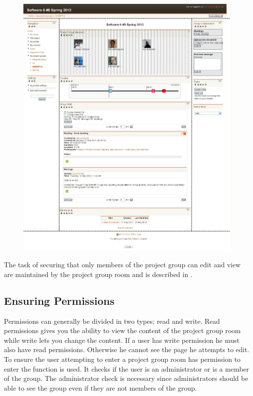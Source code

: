 \begin{figure}[h]
	\centering
		\includegraphics[width=\textwidth]{images/projectgroupwithedit.png}
	\label{fig:projectgroupwithedit}
\end{figure}


The task of securing that only members of the project group can edit and view are maintained by the project group room and is described in . 




\subsection{Ensuring Permissions}
\label{sec:projectgrouproommanagerights}
Permissions can generally be divided in two types; read and write. 
Read permissions gives you the ability to view the content of the project group room while write lets you change the content. 
If a user has write permission he must also have read permissions. 
Otherwise he cannot see the page he attempts to edit. 
To ensure the user attempting to enter a project group room has permission to enter the function  is used. 
It checks if the user is an administrator or is a member of the group. 
The administrator check is necessary since administrators should be able to see the group even if they are not members of the group. 

